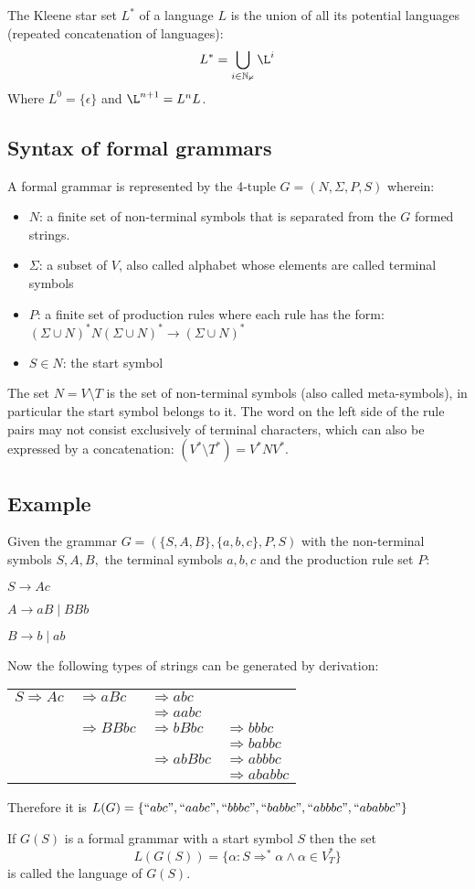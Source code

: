 The Kleene star set $L^*$ of a language $L$ is the union of all its potential languages (repeated concatenation of languages):
$$L^* = \bigcup\limits_{i\in\mathbb{N_0}} \L^{i}$$
Where $L^0 = \{\epsilon\}$ and $\L^{n+1} = L^nL$. 
\subsection{Syntax of formal grammars}
A formal grammar is represented by the 4-tuple $G=(N,\Sigma,P,S)$ wherein:
\begin{itemize}
\item $N$: a finite set of non-terminal symbols that is separated from the $G$ formed strings.
\item $\Sigma$: a subset of $V$, also called alphabet whose elements are called terminal symbols 
\item $P$: a finite set of production rules where each rule has the form: $(\Sigma \cup N)^{*}N(\Sigma \cup N)^{*}\rightarrow (\Sigma \cup N)^{*}$
\item $S \in N$: the start symbol
\end{itemize}
The set $N = V \setminus T$ is the set of non-terminal symbols (also called meta-symbols), in particular the start symbol belongs to it. The word on the left side of the rule pairs may not consist exclusively of terminal characters, which can also be expressed by a concatenation: $(V^* \setminus T^*) = V^*NV^*$.
\subsection{Example}
Given the grammar $G = (\{S,A,B\},\{a,b,c\},P,S)$ with the non-terminal symbols $S,A,B,$ the terminal symbols $a,b,c$ and the production rule set $P$:

$S \rightarrow Ac$

$A \rightarrow aB \mid BBb$

$B \rightarrow b \mid ab$

Now the following types of strings can be generated by derivation:

\begin{tabular}{llll}
$S \Rightarrow Ac$ & $\Rightarrow aBc$ & $\Rightarrow abc$ & \\
 & & $\Rightarrow aabc$ & \\
 & $\Rightarrow BBbc$ & $\Rightarrow bBbc$ & $\Rightarrow bbbc$ \\
 & & & $\Rightarrow babbc$ \\
 & & $\Rightarrow abBbc$ & $\Rightarrow abbbc$ \\
 & & & $\Rightarrow ababbc$ \\
\end{tabular}

Therefore it is $L(G) = \{``abc", ``aabc", ``bbbc", ``babbc", ``abbbc", ``ababbc"\}$

If $G(S)$ is a formal grammar with a start symbol $S$ then the set $$L(G(S)) = \{\alpha : S \Rightarrow^* \alpha \wedge \alpha \in V^{*}_{T}\}$$
is called the language of $G(S)$.